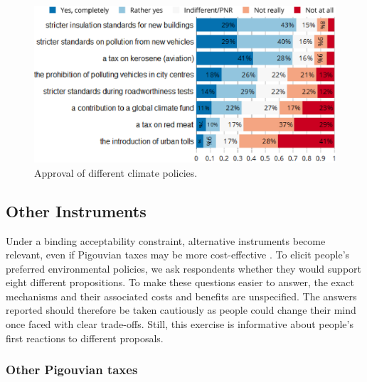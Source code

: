\documentclass[english,5p,authoryear]{elsarticle}
\begin{document}
\begin{figure}[t]
\centering
\includegraphics[width=\columnwidth]{Images_EPS/environmental_policies.eps}
\caption{Approval of different climate policies.}
\label{fig:policies}
\end{figure}

    \subsection{Other Instruments}

%

%
Under a binding acceptability constraint, alternative instruments become relevant, even if Pigouvian taxes may be more cost-effective \citep[e.g.][]{goulder_parry_2008}. To elicit people's preferred environmental policies, we ask respondents whether they would support eight different propositions. To make these questions easier to answer, the exact mechanisms and their associated costs and benefits are unspecified. The answers reported should therefore be taken cautiously as people could change their mind once faced with clear trade-offs. Still, this exercise is informative about people's first reactions to different proposals.

%

%

%
%
%
%
%
%

        \subsubsection{Other Pigouvian taxes}
\end{document}

